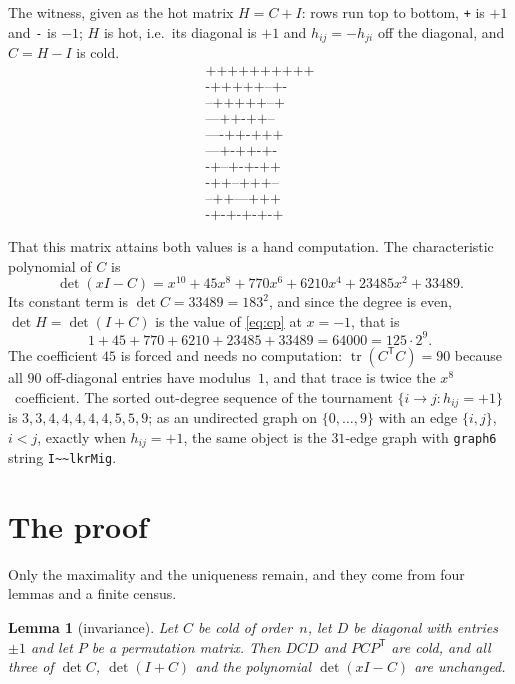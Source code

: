 \documentclass[11pt]{amsart}
\newtheorem{lemma}[theorem]{Lemma}
\theoremstyle{remark}
\begin{document}
The witness, given as the hot matrix $H=C+I$: rows run top to bottom, \texttt{+} is $+1$
and \texttt{-} is $-1$; $H$ is hot, i.e.\ its diagonal is $+1$ and $h_{ij}=-h_{ji}$ off
the diagonal, and $C=H-I$ is cold.
\begin{equation}\label{eq:H}
\begin{array}{l}
\texttt{++++++++++}\\
\texttt{-+++++--+-}\\
\texttt{--+++++--+}\\
\texttt{---++-++--}\\
\texttt{----++-+++}\\
\texttt{---+-++-+-}\\
\texttt{-+--+-+-++}\\
\texttt{-++--+++--}\\
\texttt{--++---+++}\\
\texttt{-+-+-+-+-+}
\end{array}
\end{equation}

That this matrix attains both values is a hand computation. The characteristic polynomial
of $C$ is
\begin{equation}\label{eq:cp}
  \det(xI-C)=x^{10}+45x^{8}+770x^{6}+6210x^{4}+23485x^{2}+33489 .
\end{equation}
Its constant term is $\det C=33489=183^2$, and since the degree is even,
$\det H=\det(I+C)$ is the value of \eqref{eq:cp} at $x=-1$, that is
\[
  1+45+770+6210+23485+33489=64000=125\cdot2^{9}.
\]
The coefficient $45$ is forced and needs no computation: $\operatorname{tr}(C^{\mathsf T}C)=90$
because all $90$ off-diagonal entries have modulus~$1$, and that trace is twice the
$x^{8}$~coefficient. The sorted out-degree sequence of the tournament $\{i\to j:
h_{ij}=+1\}$ is $3,3,4,4,4,4,4,5,5,9$; as an undirected graph on $\{0,\dots,9\}$ with an
edge $\{i,j\}$, $i<j$, exactly when $h_{ij}=+1$, the same object is the $31$-edge graph
with \texttt{graph6} string \verb|I~~lkrMig|.

\section{The proof}\label{sec:proof}

Only the maximality and the uniqueness remain, and they come from four lemmas and a
finite census.

\begin{lemma}[invariance]\label{lem:inv}
Let $C$ be cold of order~$n$, let $D$ be diagonal with entries $\pm1$ and let $P$ be a
permutation matrix. Then $DCD$ and $PCP^{\mathsf T}$ are cold, and all three of
$\det C$, $\det(I+C)$ and the polynomial $\det(xI-C)$ are unchanged.
\end{lemma}
\end{document}
